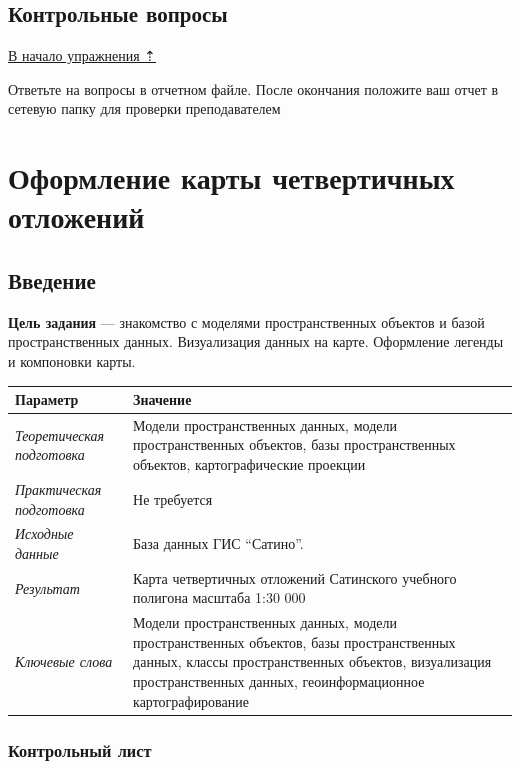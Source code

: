 \documentclass[]{book}
\theoremstyle{definition}
\theoremstyle{definition}
\theoremstyle{definition}
\theoremstyle{remark}
\begin{document}
\hypertarget{map-design-economic-questions}{%
\section{Контрольные вопросы}\label{map-design-economic-questions}}

\protect\hyperlink{map-design-economic}{В начало упражнения ⇡}

Ответьте на вопросы в отчетном файле. После окончания положите ваш отчет
в сетевую папку для проверки преподавателем

\hypertarget{map-design-quaternary}{%
\chapter{Оформление карты четвертичных
отложений}\label{map-design-quaternary}}

\hypertarget{map-design-quaternary-intro}{%
\section{Введение}\label{map-design-quaternary-intro}}

\textbf{Цель задания} --- знакомство с моделями пространственных
объектов и базой пространственных данных. Визуализация данных на карте.
Оформление легенды и компоновки карты.

\begin{longtable}[]{@{}ll@{}}
\toprule
Параметр & Значение\tabularnewline
\midrule
\endhead
\emph{Теоретическая подготовка} & Модели пространственных данных, модели
пространственных объектов, базы пространственных объектов,
картографические проекции\tabularnewline
\emph{Практическая подготовка} & Не требуется\tabularnewline
\emph{Исходные данные} & База данных ГИС ``Сатино''.\tabularnewline
\emph{Результат} & Карта четвертичных отложений Сатинского учебного
полигона масштаба 1:30 000\tabularnewline
\emph{Ключевые слова} & Модели пространственных данных, модели
пространственных объектов, базы пространственных данных, классы
пространственных объектов, визуализация пространственных данных,
геоинформационное картографирование\tabularnewline
\bottomrule
\end{longtable}

\hypertarget{map-design-quaternary-control}{%
\subsection{Контрольный лист}\label{map-design-quaternary-control}}
\end{document}
